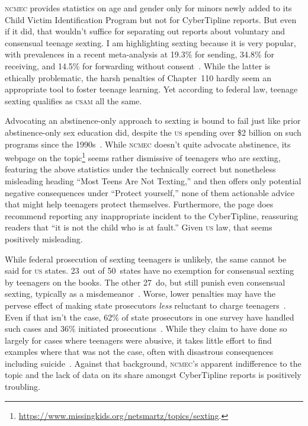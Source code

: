 \documentclass[nonacm,screen]{acmart}
\newcommand\V[1]{\textsc{\MakeLowercase{#1}}}
\begin{document}
\V{NCMEC} provides statistics on age and gender only for minors newly added to
its Child Victim Identification Program but not for CyberTipline reports. But
even if it did, that wouldn't suffice for separating out reports about voluntary
and consensual teenage sexting. I am highlighting sexting because it is very
popular, with prevalences in a recent meta-analysis at 19.3\% for sending,
34.8\% for receiving, and 14.5\% for forwarding without
consent~\cite{MoriParkea2022}. While the latter is ethically problematic, the
harsh penalties of Chapter~110 hardly seem an appropriate tool to foster teenage
learning. Yet according to federal law, teenage sexting qualifies as \V{CSAM}
all the same.

Advocating an abstinence-only approach to sexting is bound to fail just like
prior abstinence-only sex education did, despite the \V{US} spending over \$2
billion on such programs since the 1990s~\cite{FoxHimmelsteinea2019}. While
\V{NCMEC} doesn't quite advocate abstinence, its webpage on the
topic\footnote{\url{https://www.missingkids.org/netsmartz/topics/sexting}.}
seems rather dismissive of teenagers who are sexting, featuring the above
statistics under the technically correct but nonetheless misleading heading
``Most Teens Are Not Texting,'' and then offers only potential negative
consequences under ``Protect yourself,'' none of them actionable advice that
might help teenagers protect themselves. Furthermore, the page does recommend
reporting any inappropriate incident to the CyberTipline, reassuring readers
that ``it is not the child who is at fault.'' Given \V{US} law, that seems
positively misleading.

While federal prosecution of sexting teenagers is unlikely, the same cannot be
said for \V{US} states. 23~out of 50~states have no exemption for consensual
sexting by teenagers on the books. The other 27~do, but still punish even
consensual sexting, typically as a misdemeanor~\cite{HindujaPatchin2022,
HoloydaLandessea2018,StrasburgerZimmermanea2019}. Worse, lower penalties may
have the pervese effect of making state prosecutors \emph{less} reluctant to
charge teenagers~\cite{Hasinoff2016}. Even if that isn't the case, 62\% of state
prosecutors in one survey have handled such cases and 36\% initiated
prosecutions~\cite{WalshWolakea2013}. While they claim to have done so largely
for cases where teenagers were abusive, it takes little effort to find examples
where that was not the case, often with disastrous consequences including
suicide~\cite{Dunlap2016,Feldman2020,Jouvenal2023,LorangMcNielea2016,Miller2015,
WolakFinkelhorea2012}. Against that background, \V{NCMEC}'s apparent
indifference to the topic and the lack of data on its share amongst CyberTipline
reports is positively troubling.
\end{document}
